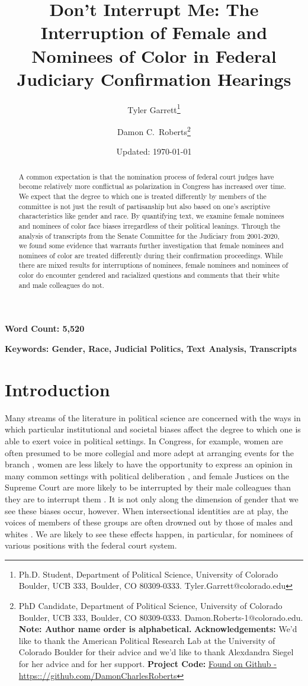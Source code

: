 \documentclass [12pt]{article}
\title{Don't Interrupt Me: The Interruption of Female and Nominees of Color in Federal Judiciary Confirmation Hearings}
\author{Tyler Garrett\footnote{Ph.D. Student, Department of Political Science, University of Colorado Boulder, UCB 333, Boulder, CO 80309-0333. Tyler.Garrett@colorado.edu} \and Damon C.\ Roberts\footnote{PhD Candidate,
		Department of Political Science, University of Colorado Boulder, UCB 333, Boulder, CO 80309-0333. Damon.Roberts-1@colorado.edu. \newline \textbf{Note: Author name order is alphabetical.} \newline \textbf{Acknowledgements:} We'd like to thank the American Political Research Lab at the University of Colorado Boulder for their advice and we'd like to thank Alexdandra Siegel for her advice and for her support. \newline \textbf{Project Code:} \href{https://github.com/DamonCharlesRoberts/judiciary_hearing_interruptions}{Found on Github - https:://github.com/DamonCharlesRoberts}}}
\date{Updated: \today}
\begin{document}
	\maketitle
	\begin{abstract}
A common expectation is that the nomination process of federal court judges have become relatively more conflictual as polarization in Congress has increased over time. We expect that the degree to which one is treated differently by members of the committee is not just the result of partisanship but also based on one's ascriptive characteristics like gender and race. By quantifying text, we examine female nominees and nominees of color face biases irregardless of their political leanings. Through the analysis of transcripts from the Senate Committee for the Judiciary from 2001-2020, we found some evidence that warrants further investigation that female nominees and nominees of color are treated differently during their confirmation proceedings. While there are mixed results for interruptions of nominees, female nominees and nominees of color do encounter gendered and racialized questions and comments that their white and male colleagues do not. 
	\end{abstract}
	
	\textbf{Word Count: 5,520} 
	
	\textbf{Keywords: Gender, Race, Judicial Politics, Text Analysis, Transcripts}

	\cleardoublepage
    \setcounter{page}{2}
	\newpage
	\doublespace
	\newpage 

\section{Introduction}
	
Many streams of the literature in political science are concerned with the ways in which particular institutional and societal biases affect the degree to which one is able to exert voice in political settings. In Congress, for example, women are often presumed to be more collegial and more adept at arranging events for the branch \citep{Lawless2018}, women are less likely to have the opportunity to express an opinion in many common settings with political deliberation  \citep{Karpowitz2012}, and female Justices on the Supreme Court are more likely to be interrupted by their male colleagues than they are to interrupt them \citep{Jacobi2017}. It is not only along the dimension of gender that we see these biases occur, however. When intersectional identities are at play, the voices of members of these groups are often drowned out by those of males and whites \citep[see][for example]{Strolovitch2006}. We are likely to see these effects happen, in particular, for nominees of various positions with the federal court system. 
\end{document}

